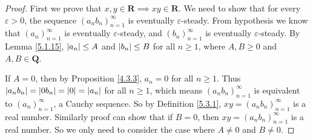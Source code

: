 \begin{proof}
    First we prove that \(x, y \in \mathbf{R} \implies xy \in \mathbf{R}\).
    We need to show that for every \(\varepsilon > 0\), the sequence \((a_n b_n)_{n = 1}^{\infty}\) is eventually \(\varepsilon\)-steady.
    From hypothesis we know that \((a_n)_{n = 1}^{\infty}\) is eventually \(\varepsilon\)-steady, and \((b_n)_{n = 1}^{\infty}\) is eventually \(\varepsilon\)-steady.
    By Lemma \ref{5.1.15}, \(\abs*{a_n} \leq A\) and \(\abs*{b_n} \leq B\) for all \(n \geq 1\), where \(A, B \geq 0\) and \(A, B \in \mathbf{Q}\).

    If \(A = 0\), then by Proposition \ref{4.3.3}, \(a_n = 0\) for all \(n \geq 1\).
    Thus \(\abs*{a_n b_n} = \abs*{0b_n} = \abs*{0} = \abs*{a_n}\) for all \(n \geq 1\), which means \((a_n b_n)_{n = 1}^{\infty}\) is equivalent to \((a_n)_{n = 1}^{\infty}\), a Cauchy sequence.
    So by Definition \ref{5.3.1}, \(xy = (a_n b_n)_{n = 1}^{\infty}\) is a real number.
    Similarly proof can show that if \(B = 0\), then \(xy = (a_n b_n)_{n = 1}^{\infty}\) is a real number.
    So we only need to consider the case where \(A \neq 0\) and \(B \neq 0\).


\end{proof}
